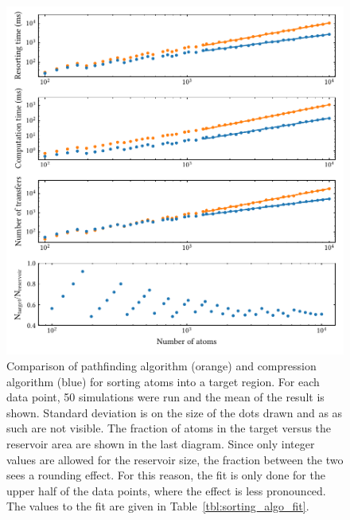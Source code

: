 \begin{figure}[tbp]%
\centering
\includegraphics{figures/sorting_algos_155.pdf}
\caption{Comparison of pathfinding algorithm (orange) and compression algorithm (blue) for sorting atoms into a target region. For each data point, 50 simulations were run and the mean of the result is shown. Standard deviation is on the size of the dots drawn and as as such are not visible. The fraction of atoms in the target versus the reservoir area are shown in the last diagram. Since only integer values are allowed for the reservoir size, the fraction between the two sees a rounding effect. For this reason, the fit is only done for the upper half of the data points, where the effect is less pronounced. The values to the fit are given in Table~\ref{tbl:sorting_algo_fit}.}%
\label{fig:sorting_algos}
\end{figure}


